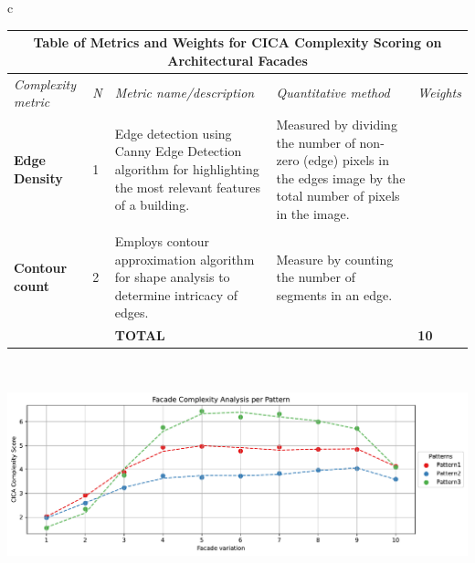 \begin{linenumbers}
\begin{table}[htb]
\centering
\small
\begin{tabular}{c}
\begin{minipage}{\textwidth}
\centering
{}
\label{tab:MetricsandWeights}
\begin{tabularx}{\textwidth}{p{2.5cm} p{1cm} X X >{\centering\arraybackslash}p{1cm}}
\toprule
\multicolumn{5}{c}{\textbf{Table of Metrics and Weights for CICA Complexity Scoring on Architectural Facades}} \\
\toprule
\textit{Complexity metric} & \textit{N} & \textit{Metric name/description} & \textit{Quantitative   method} & \textit{Weights} \\ \midrule
\textbf{Edge Density} &
1 &
Edge detection using Canny Edge Detection algorithm for highlighting the most relevant features of a building.& Measured by dividing the number of non-zero (edge) pixels in the edges image by the total number of pixels in the image.&
8\\
\\
\textbf{Contour count} &
2 &
Employs contour approximation algorithm for shape analysis to determine intricacy of edges.
&
Measure by counting the number of segments in an edge.
&
2\\ \bottomrule
&
&
\textbf{TOTAL} &
&
\textbf{10}\\ \bottomrule
\end{tabularx}
\end{minipage}
\\
\begin{minipage}{\textwidth}
\centering
\includegraphics[width= \linewidth]{Graphs/complexitygraphrender}

\end{minipage}
\end{tabular}
\end{table}
\end{linenumbers}
